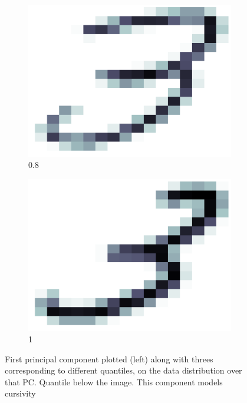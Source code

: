 \documentclass[a4paper, 10pt]{article}
\begin{document}
\begin{figure}[h]
\begin{subfigure}[t]{0.16\linewidth}
      \includegraphics[width=1\linewidth]{./lab3/PCA/PC_interpret/PC1_08.png}
      \caption{0.8}
      \label{fig:quant08}
    \end{subfigure}
    \begin{subfigure}[t]{0.16\linewidth}
      \includegraphics[width=1\linewidth]{./lab3/PCA/PC_interpret/PC1_1.png}
      \caption{1}
      \label{fig:quant1}
    \end{subfigure}
    \caption{First principal component plotted (left) along with threes corresponding
      to different quantiles, on the data distribution over that PC. Quantile below
    the image. %
    This component models cursivity
  }
    \label{fig:quantiles}
  \end{figure}
\end{document}
